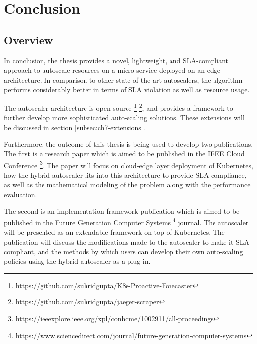 \clearpage

\def\chaptertitle{Conclusion}

\lhead{\emph{\chaptertitle}}

\chapter{\chaptertitle}
\label{ch:conclusion}

\section{Overview}
\label{sec:ch7-overview}

In conclusion, the thesis provides a novel, lightweight, and SLA-compliant approach to autoscale resources on a micro-service deployed on an edge architecture. In comparison to other state-of-the-art autoscalers, the algorithm performs considerably better in terms of SLA violation as well as resource usage.\par

The autoscaler architecture is open source \footnote{\url{https://github.com/suhridgupta/K8s-Proactive-Forecaster}} \footnote{\url{https://github.com/suhridgupta/jaeger-scraper}}, and provides a framework to further develop more sophisticated auto-scaling solutions. These extensions will be discussed in section \ref{subsec:ch7-extensions}.\par

Furthermore, the outcome of this thesis is being used to develop two publications. The first is a research paper which is aimed to be published in the IEEE Cloud Conference \footnote{\url{https://ieeexplore.ieee.org/xpl/conhome/1002911/all-proceedings}}. The paper will focus on cloud-edge layer deployment of Kubernetes, how the hybrid autoscaler fits into this architecture to provide SLA-compliance, as well as the mathematical modeling of the problem along with the performance evaluation.\par

The second is an implementation framework publication which is aimed to be published in the Future Generation Computer Systems \footnote{\url{https://www.sciencedirect.com/journal/future-generation-computer-systems}} journal. The autoscaler will be presented as an extendable framework on top of Kubernetes. The publication will discuss the modifications made to the autoscaler to make it SLA-compliant, and the methods by which users can develop their own auto-scaling policies using the hybrid autoscaler as a plug-in.\par

